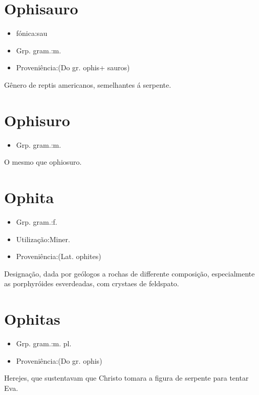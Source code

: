 \section{Ophisauro}
\begin{itemize}
\item {fónica:sau}
\end{itemize}
\begin{itemize}
\item {Grp. gram.:m.}
\end{itemize}
\begin{itemize}
\item {Proveniência:(Do gr. \textunderscore ophis\textunderscore  + \textunderscore sauros\textunderscore )}
\end{itemize}
Gênero de reptis americanos, semelhantes á serpente.
\section{Ophisuro}
\begin{itemize}
\item {Grp. gram.:m.}
\end{itemize}
O mesmo que \textunderscore ophiosuro\textunderscore .
\section{Ophita}
\begin{itemize}
\item {Grp. gram.:f.}
\end{itemize}
\begin{itemize}
\item {Utilização:Miner.}
\end{itemize}
\begin{itemize}
\item {Proveniência:(Lat. \textunderscore ophites\textunderscore )}
\end{itemize}
Designação, dada por geólogos a rochas de differente composição, especialmente as porphyróides esverdeadas, com crystaes de feldspato.
\section{Ophitas}
\begin{itemize}
\item {Grp. gram.:m. pl.}
\end{itemize}
\begin{itemize}
\item {Proveniência:(Do gr. \textunderscore ophis\textunderscore )}
\end{itemize}
Herejes, que sustentavam que Christo tomara a figura de serpente para tentar Eva.

